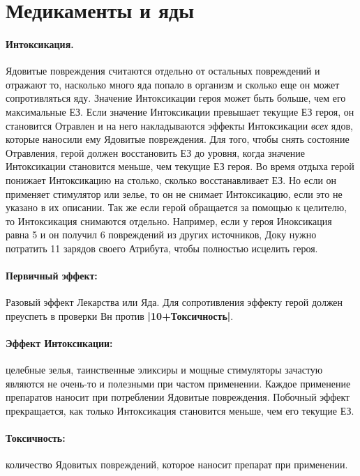 \section{Медикаменты и яды}
\paragraph{Интоксикация.} Ядовитые повреждения считаются отдельно от остальных повреждений и отражают то, насколько много яда попало в организм и сколько еще он может сопротивляться яду.
\newline
Значение Интоксикации героя может быть больше, чем его максимальные ЕЗ.
\newline
Если значение Интоксикации превышает текущие ЕЗ героя, он становится Отравлен и на него накладываются эффекты Интоксикации \textit{всех} ядов, которые наносили ему Ядовитые повреждения. Для того, чтобы снять состояние Отравления, герой должен восстановить ЕЗ до уровня, когда значение Интоксикации становится меньше, чем текущие ЕЗ героя.
\newline
Во время отдыха герой понижает Интоксикацию на столько, сколько восстанавливает ЕЗ. Но если он применяет стимулятор или зелье, то он не снимает Интоксикацию, если это не указано в их описании. Так же если герой обращается за помощью к целителю, то Интоксикация снимаются отдельно.
\newline
Например, если у героя Иноксикация равна 5 и он получил 6 повреждений из других источников, Доку нужно потратить 11 зарядов своего Атрибута, чтобы полностью исцелить героя.
\paragraph{Первичный эффект:} Разовый эффект Лекарства или Яда. Для сопротивления эффекту герой должен преуспеть в проверки Вн против \textbf{|10+Токсичность|}.
\paragraph{Эффект Интоксикации:} целебные зелья, таинственные эликсиры и мощные стимуляторы зачастую являются не очень-то и полезными при частом применении. Каждое применение препаратов наносит при потреблении Ядовитые повреждения. Побочный эффект прекращается, как только Интоксикация становится меньше, чем его текущие ЕЗ.
\paragraph{Токсичность:} количество Ядовитых повреждений, которое наносит препарат при применении.
